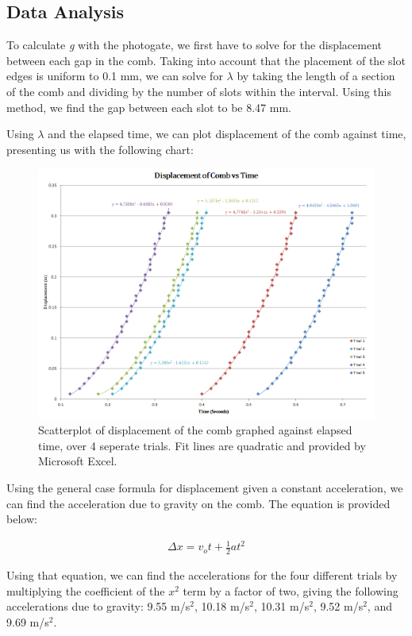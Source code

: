 \documentclass[titlepage]{article}
\begin{document}
\subsection{Data Analysis}
To calculate \textit{g} with the photogate, we first have to solve for the displacement between each gap in the comb. Taking into account that the placement of the slot edges is uniform to 0.1 mm, we can solve for $\lambda$ by taking the length of a section of the comb and dividing by the number of slots within the interval. Using this method, we find the gap between each slot to be 8.47 mm. 

\pagebreak

Using $\lambda$ and the elapsed time, we can plot displacement of the comb against time, presenting us with the following chart:

\begin{figure}[!htbp]
    \centering
    \includegraphics[width=5.0in]{CombGraph.png}
    \caption{Scatterplot of displacement of the comb graphed against elapsed time, over 4 seperate trials. Fit lines are quadratic and provided by Microsoft Excel.}
\end{figure}

Using the general case formula for displacement given a constant acceleration, we can find the acceleration due to gravity on the comb. The equation is provided below:

\begin{align}
     \Delta x = v_ot+\frac{1}{2}at^2
\end{align}

Using that equation, we can find the accelerations for the four different trials by multiplying the coefficient of the $x^2$ term by a factor of two, giving the following accelerations due to gravity: 9.55 m/s$^2$, 10.18 m/s$^2$, 10.31 m/s$^2$, 9.52 m/s$^2$, and 9.69 m/s$^2$.
\end{document}
